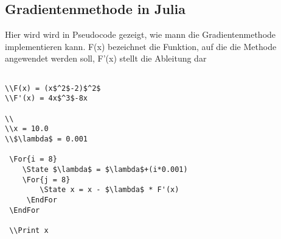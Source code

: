 \subsection{Gradientenmethode in Julia}

Hier wird wird in Pseudocode gezeigt, wie mann die Gradientenmethode implementieren kann.
F(x) bezeichnet die Funktion, auf die die Methode angewendet werden soll, F'(x) stellt die Ableitung dar 

\begin{verbatim}

\\F(x) = (x$^2$-2)$^2$
\\F'(x) = 4x$^3$-8x

\\
\\x = 10.0
\\$\lambda$ = 0.001

 \For{i = 8}
 	\State $\lambda$ = $\lambda$+(i*0.001)
	\For{j = 8}
		\State x = x - $\lambda$ * F'(x)
	 \EndFor
 \EndFor
 
 \\Print x
\end{verbatim}